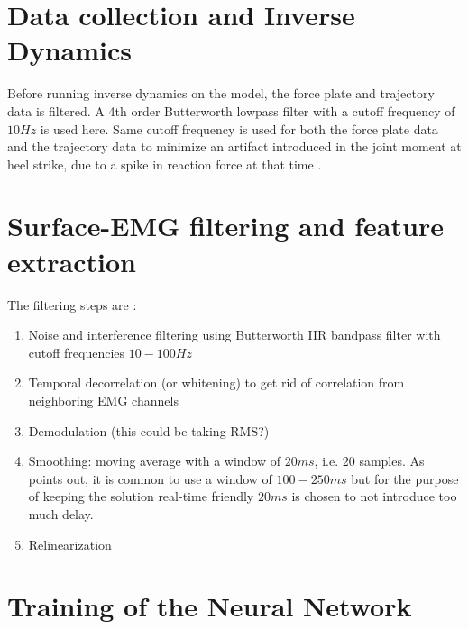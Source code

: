 \documentclass[../main.tex]{subfiles}
\begin{document}
\section{Data collection and Inverse Dynamics}
Before running inverse dynamics on the model, the force plate and trajectory data is filtered. A 4th order Butterworth lowpass filter with a cutoff frequency of $10Hz$ is used here. Same cutoff frequency is used for both the force plate data and the trajectory data to minimize an artifact introduced in the joint moment at heel strike, due to a spike in reaction force at that time \cite{Kristianslund2012}.

\section{Surface-EMG filtering and feature extraction}
The filtering steps are \parencite[99]{Clancy2016}:
\begin{enumerate}
    \item Noise and interference filtering using Butterworth IIR bandpass filter with cutoff frequencies $10-100Hz$
    \item Temporal decorrelation (or whitening) to get rid of correlation from neighboring EMG channels
    \item Demodulation (this could be taking RMS?)
    \item Smoothing: moving average with a window of $20ms$, i.e. 20 samples. As \citeauthor{Clancy2016} points out, it is common to use a window of $100-250 ms$ but for the purpose of keeping the solution real-time friendly $20ms$ is chosen to not introduce too much delay.
    \item Relinearization
\end{enumerate}

\section{Training of the Neural Network}
\end{document}
